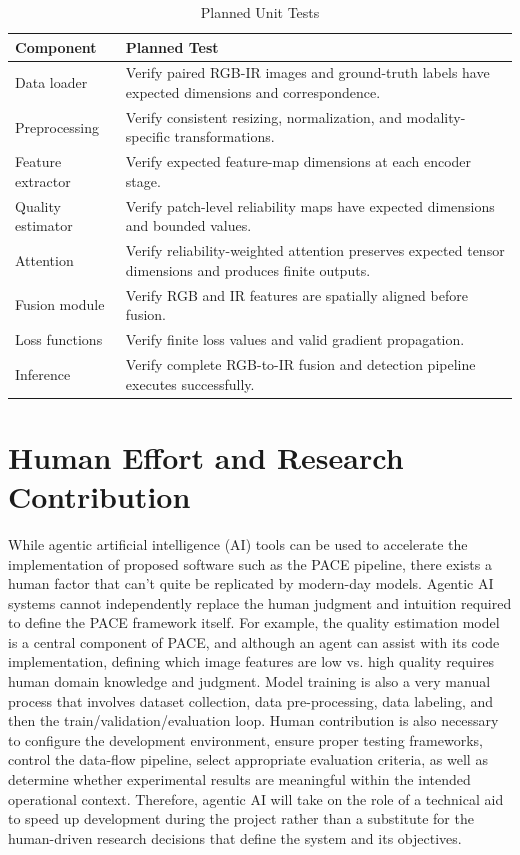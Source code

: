 \documentclass[conference]{IEEEtran}
\begin{document}
\renewcommand{\arraystretch}{1.15}
\begin{table}[H]
\centering
\caption{Planned Unit Tests}
\label{tab:tests}
\begin{tabular}{p{} p{}}
\toprule
\textbf{Component} & \textbf{Planned Test} \\
\midrule
Data loader & Verify paired RGB-IR images and ground-truth labels have expected dimensions and correspondence. \\
Preprocessing & Verify consistent resizing, normalization, and modality-specific transformations. \\
Feature extractor & Verify expected feature-map dimensions at each encoder stage. \\
Quality estimator & Verify patch-level reliability maps have expected dimensions and bounded values. \\
Attention & Verify reliability-weighted attention preserves expected tensor dimensions and produces finite outputs. \\
Fusion module & Verify RGB and IR features are spatially aligned before fusion. \\
Loss functions & Verify finite loss values and valid gradient propagation. \\
Inference & Verify complete RGB-to-IR fusion and detection pipeline executes successfully. \\
\bottomrule
\end{tabular}
\end{table}


\section{Human Effort and Research Contribution}

While agentic artificial intelligence (AI) tools can be used to accelerate the implementation of proposed software such as the PACE pipeline, there exists a human factor that can't quite be replicated by modern-day models. Agentic AI systems cannot independently replace the human judgment and intuition required to define the PACE framework itself. For example, the quality estimation model is a central component of PACE, and although an agent can assist with its code implementation, defining which image features are low vs. high quality requires human domain knowledge and judgment. Model training is also a very manual process that involves dataset collection, data pre-processing, data labeling, and then the train/validation/evaluation loop. Human contribution is also necessary to configure the development environment, ensure proper testing frameworks, control the data-flow pipeline, select appropriate evaluation criteria, as well as determine whether experimental results are meaningful within the intended operational context. Therefore, agentic AI will take on the role of a technical aid to speed up development during the project rather than a substitute for the human-driven research decisions that define the system and its objectives.
\end{document}
